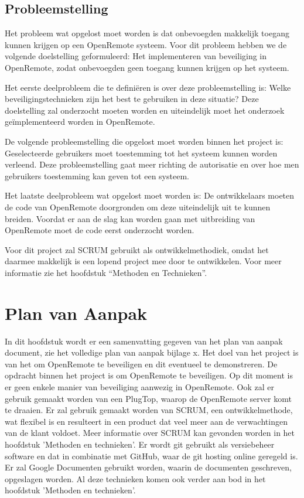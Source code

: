 \documentclass[]{article}
\begin{document}
\subsection{Probleemstelling}

Het probleem wat opgelost moet worden is dat onbevoegden makkelijk toegang
kunnen krijgen op een OpenRemote systeem. Voor dit probleem hebben we de
volgende doelstelling geformuleerd: Het implementeren van beveiliging in
OpenRemote, zodat onbevoegden geen toegang kunnen krijgen op het systeem.

Het eerste deelprobleem die te definiëren is over deze probleemstelling is:
Welke beveiligingstechnieken zijn het best te gebruiken in deze situatie?
Deze doelstelling zal onderzocht moeten worden en uiteindelijk moet het
onderzoek geïmplementeerd worden in OpenRemote.

De volgende probleemstelling die opgelost moet worden binnen het project
is: Geselecteerde gebruikers moet toestemming tot het systeem kunnen worden
verleend. Deze probleemstelling gaat meer richting de autorisatie en over
hoe men gebruikers toestemming kan geven tot een systeem.

Het laatste deelprobleem wat opgelost moet worden is: De ontwikkelaars
moeten de code van OpenRemote doorgronden om deze uiteindelijk uit te
kunnen breiden. Voordat er aan de slag kan worden gaan met uitbreiding van
OpenRemote moet de code eerst onderzocht worden.

Voor dit project zal SCRUM gebruikt als ontwikkelmethodiek, omdat het
daarmee makkelijk is een lopend project mee door te ontwikkelen. Voor meer
informatie zie het hoofdstuk “Methoden en Technieken”.

\newpage
\section{Plan van Aanpak}

In dit hoofdstuk wordt er een samenvatting gegeven van het plan  van  aanpak
document, zie het volledige plan van aanpak bijlage  x.  Het  doel  van  het
project is  van  het  om  OpenRemote  te  beveiligen  en  dit  eventueel  te
demonstreren.  De  opdracht  binnen  het  project  is   om   OpenRemote   te
beveiligen. Op dit moment is er geen enkele manier van beveiliging  aanwezig
in OpenRemote. Ook zal er gebruik gemaakt worden van een PlugTop, waarop  de
OpenRemote server komt te draaien. Er zal gebruik gemaakt worden van  SCRUM,
een ontwikkelmethode, wat flexibel is en resulteert in een product dat  veel
meer aan de verwachtingen van de klant voldoet. Meer informatie  over  SCRUM
kan gevonden worden in het hoofdstuk 'Methoden en technieken'.
Er wordt git gebruikt als versiebeheer software en  dat  in  combinatie  met
GitHub, waar de git hosting online geregeld is.  Er  zal  Google  Documenten
gebruikt worden, waarin de documenten geschreven, opgeslagen worden.
Al deze technieken komen ook verder aan bod in het  hoofdstuk  'Methoden  en
technieken'.
\end{document}
